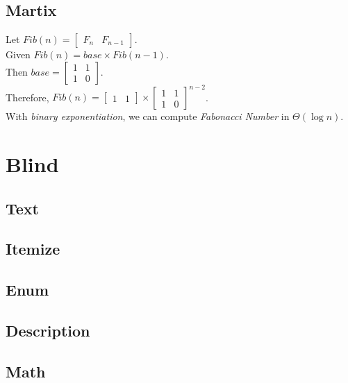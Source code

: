 \documentclass[12pt, a4paper]{article}
\begin{document}
\subsection{Martix}
Let $Fib(n) = \begin{bmatrix} F_n & F_{n-1}\end{bmatrix}$.\\[1cm]
Given $Fib(n) = base \times Fib(n-1)$.\\[1em]
Then $base = \begin{bmatrix} 1 & 1 \\ 1 & 0\end{bmatrix}$.\\
Therefore, $Fib(n) = \begin{bmatrix} 1 & 1\end{bmatrix} \times \begin{bmatrix} 1 & 1 \\ 1 & 0\end{bmatrix}^{n-2}$.\\[10pt]
With \textsl{binary exponentiation}, we can compute \textit{Fabonacci Number} in $\Theta(\log n)$.
\pagebreak
\section{Blind}
\subsection{Text}
\blindtext
\subsection{Itemize}
\blinditemize[5]
\subsection{Enum}
\blindenumerate[5]
\subsection{Description}
\blinddescription[5]
\subsection{Math}
\blindmathpaper
\end{document}
